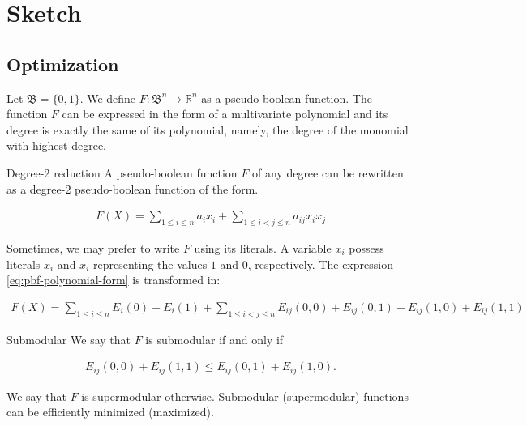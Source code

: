 \chapter{Sketch}\label{app:sketch}

\section{Optimization}

Let $\mathfrak{B}=\{0,1\}$. We define $F:\mathfrak{B}^n\rightarrow \mathbb{R}^n$ as a pseudo-boolean function. The function $F$ can be expressed in the form of a multivariate polynomial and its degree is exactly the same of its polynomial, namely, the degree of the monomial with highest degree.

\begin{claim}{Degree-2 reduction}
	A pseudo-boolean function $F$ of any degree can be rewritten as a degree-2 pseudo-boolean function of the form.	
	
\begin{align}\label{eq:pbf-polynomial-form}
	F(X) = \sum_{1\leq i\leq n}{a_ix_i} + \sum_{1 \leq i < j \leq n}{a_{ij}x_ix_j}	
\end{align}	
	
\end{claim}

Sometimes, we may prefer to write $F$ using its literals. A variable $x_i$ possess literals $x_i$ and $\overline{x_i}$ representing the values $1$ and $0$, respectively. The expression \eqref{eq:pbf-polynomial-form} is transformed in:

\begin{align}
	F(X) = \sum_{1\leq i\leq n}{E_i(0) + E_i(1)} + \sum_{1 \leq i < j \leq n}{E_{ij}(0,0) + E_{ij}(0,1) + E_{ij}(1,0) + E_{ij}(1,1)}
\end{align}


\begin{claim}{Submodular} \label{claim:submodular}
 We say that $F$ is submodular if and only if 
 
 \begin{align*}
	E_{ij}(0,0) + E_{ij}(1,1) \leq E_{ij}(0,1) + E_{ij}(1,0).
 \end{align*}
\end{claim}

We say that $F$ is supermodular otherwise. Submodular (supermodular) functions can be efficiently minimized (maximized).

%
%

